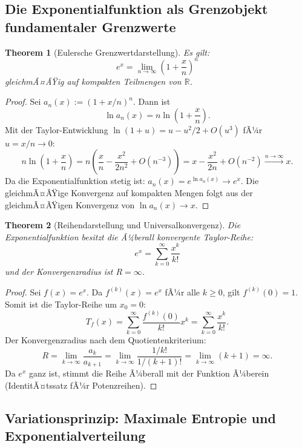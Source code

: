 ﻿\documentclass[12pt,a4paper]{article}
\newtheorem{theorem}{Theorem}[section]
\theoremstyle{definition}
\theoremstyle{remark}
\begin{document}
\subsection{Die Exponentialfunktion als Grenzobjekt fundamentaler Grenzwerte}

\begin{theorem}[Eulersche Grenzwertdarstellung]
\label{thm:euler_grenzwert}
Es gilt:
\begin{equation}
e^x = \lim_{n\to\infty}\left(1 + \frac{x}{n}\right)^n
\label{eq:euler_limes}
\end{equation}
gleichmÃ¤ÃŸig auf kompakten Teilmengen von $\mathbb{R}$.
\end{theorem}
\begin{proof}
Sei $a_n(x) := (1+x/n)^n$. Dann ist
\[
\ln a_n(x) = n\ln\!\left(1 + \frac{x}{n}\right).
\]
Mit der Taylor-Entwicklung $\ln(1+u) = u - u^2/2 + O(u^3)$ fÃ¼r $u = x/n \to 0$:
\[
n\ln\!\left(1 + \frac{x}{n}\right) = n\left(\frac{x}{n} - \frac{x^2}{2n^2} + O(n^{-3})\right) = x - \frac{x^2}{2n} + O(n^{-2}) \xrightarrow{n\to\infty} x.
\]
Da die Exponentialfunktion stetig ist: $a_n(x) = e^{\ln a_n(x)} \to e^x$. Die gleichmÃ¤ÃŸige Konvergenz auf kompakten Mengen folgt aus der gleichmÃ¤ÃŸigen Konvergenz von $\ln a_n(x) \to x$. 
\end{proof}

\begin{theorem}[Reihendarstellung und Universalkonvergenz]
\label{thm:reihe_exp}
Die Exponentialfunktion besitzt die Ã¼berall konvergente Taylor-Reihe:
\begin{equation}
e^x = \sum_{k=0}^{\infty} \frac{x^k}{k!}
\end{equation}
und der Konvergenzradius ist $R = \infty$.
\end{theorem}
\begin{proof}
Sei $f(x) = e^x$. Da $f^{(k)}(x) = e^x$ fÃ¼r alle $k \geq 0$, gilt $f^{(k)}(0) = 1$. Somit ist die Taylor-Reihe um $x_0=0$:
\[
T_f(x) = \sum_{k=0}^\infty \frac{f^{(k)}(0)}{k!}x^k = \sum_{k=0}^\infty \frac{x^k}{k!}.
\]
Der Konvergenzradius nach dem Quotientenkriterium:
\[
R = \lim_{k\to\infty}\frac{a_k}{a_{k+1}} = \lim_{k\to\infty}\frac{1/k!}{1/(k+1)!} = \lim_{k\to\infty}(k+1) = \infty.
\]
Da $e^x$ ganz ist, stimmt die Reihe Ã¼berall mit der Funktion Ã¼berein (IdentitÃ¤tssatz fÃ¼r Potenzreihen). 
\end{proof}

\subsection{Variationsprinzip: Maximale Entropie und Exponentialverteilung}
\end{document}
